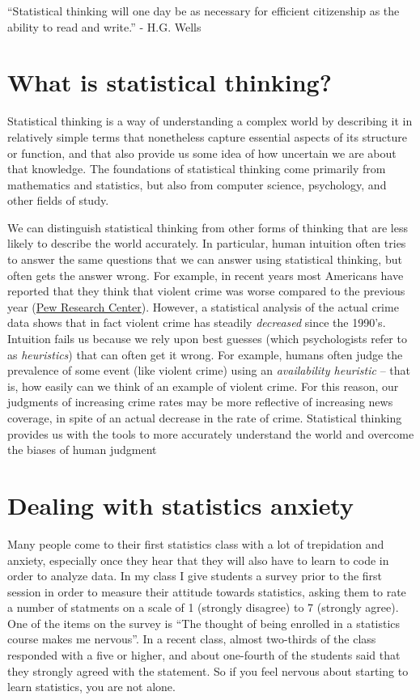 \documentclass[12pt,]{book}
\theoremstyle{definition}
\theoremstyle{definition}
\theoremstyle{definition}
\theoremstyle{remark}
\begin{document}
``Statistical thinking will one day be as necessary for efficient citizenship as the ability to read and write.'' - H.G. Wells

\hypertarget{what-is-statistical-thinking}{%
\section{What is statistical thinking?}\label{what-is-statistical-thinking}}

Statistical thinking is a way of understanding a complex world by describing it in relatively simple terms that nonetheless capture essential aspects of its structure or function, and that also provide us some idea of how uncertain we are about that knowledge. The foundations of statistical thinking come primarily from mathematics and statistics, but also from computer science, psychology, and other fields of study.

We can distinguish statistical thinking from other forms of thinking that are less likely to describe the world accurately. In particular, human intuition often tries to answer the same questions that we can answer using statistical thinking, but often gets the answer wrong. For example, in recent years most Americans have reported that they think that violent crime was worse compared to the previous year (\href{http://www.pewresearch.org/fact-tank/2018/01/30/5-facts-about-crime-in-the-u-s/}{Pew Research Center}). However, a statistical analysis of the actual crime data shows that in fact violent crime has steadily \emph{decreased} since the 1990's. Intuition fails us because we rely upon best guesses (which psychologists refer to as \emph{heuristics}) that can often get it wrong. For example, humans often judge the prevalence of some event (like violent crime) using an \emph{availability heuristic} -- that is, how easily can we think of an example of violent crime. For this reason, our judgments of increasing crime rates may be more reflective of increasing news coverage, in spite of an actual decrease in the rate of crime. Statistical thinking provides us with the tools to more accurately understand the world and overcome the biases of human judgment

\hypertarget{dealing-with-statistics-anxiety}{%
\section{Dealing with statistics anxiety}\label{dealing-with-statistics-anxiety}}

Many people come to their first statistics class with a lot of trepidation and anxiety, especially once they hear that they will also have to learn to code in order to analyze data. In my class I give students a survey prior to the first session in order to measure their attitude towards statistics, asking them to rate a number of statments on a scale of 1 (strongly disagree) to 7 (strongly agree). One of the items on the survey is ``The thought of being enrolled in a statistics course makes me nervous''. In a recent class, almost two-thirds of the class responded with a five or higher, and about one-fourth of the students said that they strongly agreed with the statement. So if you feel nervous about starting to learn statistics, you are not alone.
\end{document}

